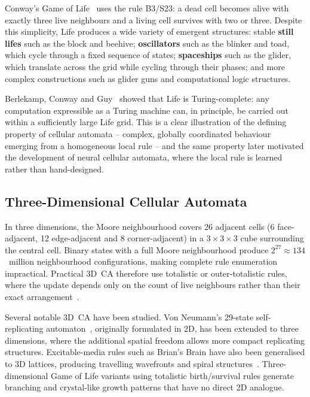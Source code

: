 Conway's Game of Life~\cite{Gardner1970} uses the rule B3/S23: a dead cell becomes
alive with exactly three live neighbours and a living cell survives with two or
three. Despite this simplicity, Life produces a wide variety of emergent structures:
stable \textbf{still lifes} such as the block and beehive; \textbf{oscillators} such
as the blinker and toad, which cycle through a fixed sequence of states;
\textbf{spaceships} such as the glider, which translate across the grid while cycling
through their phases; and more complex constructions such as glider guns and
computational logic structures.

Berlekamp, Conway and Guy~\cite{Berlekamp1982} showed that Life is Turing-complete:
any computation expressible as a Turing machine can, in principle, be carried out
within a sufficiently large Life grid. This is a clear illustration of the defining
property of cellular automata -- complex, globally coordinated behaviour emerging
from a homogeneous local rule -- and the same property later motivated the
development of neural cellular automata, where the local rule is learned rather than
hand-designed.

\subsection{Three-Dimensional Cellular Automata}

In three dimensions, the Moore neighbourhood covers 26 adjacent cells (6
face-adjacent, 12 edge-adjacent and 8 corner-adjacent) in a $3\times3\times3$ cube
surrounding the central cell. Binary states with a full Moore neighbourhood produce
$2^{27} \approx 134$~million neighbourhood configurations, making complete rule
enumeration impractical. Practical 3D~CA therefore use totalistic or outer-totalistic
rules, where the update depends only on the count of live neighbours rather than their
exact arrangement~\cite{Wolfram2002}.

Several notable 3D~CA have been studied. Von Neumann's 29-state self-replicating
automaton~\cite{VonNeumann1966}, originally formulated in 2D, has been extended to
three dimensions, where the additional spatial freedom allows more compact replicating
structures. Excitable-media rules such as Brian's Brain have also been generalised to
3D lattices, producing travelling wavefronts and spiral structures~\cite{DeKinderen1998}.
Three-dimensional Game of Life variants using totalistic birth/survival rules generate
branching and crystal-like growth patterns that have no direct 2D analogue.

